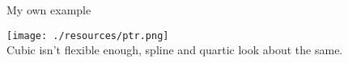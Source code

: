   
  
\begin{frame}{My own example}
\begin{center}
\texttt{[image: ./resources/ptr.png]}\\
Cubic isn't flexible enough, spline and quartic look about the same.
\end{center}
\end{frame}



